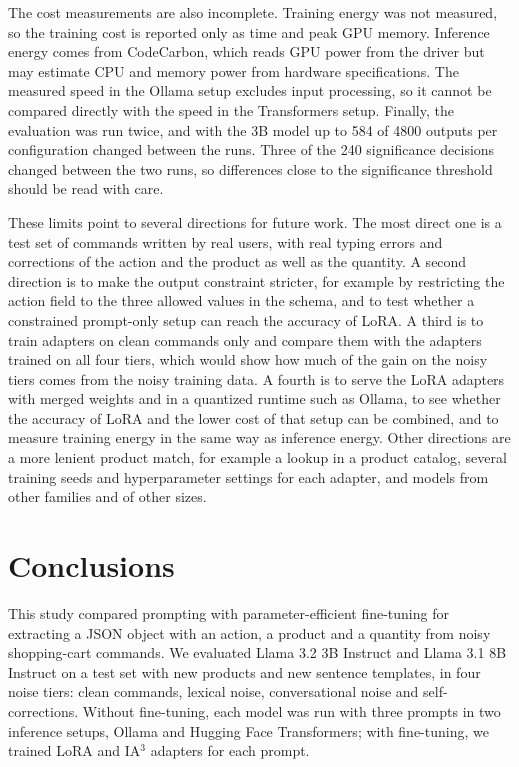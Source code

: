 \documentclass[journal,article,submit,pdftex,moreauthors]{Definitions/mdpi}
\begin{document}
The cost measurements are also incomplete. Training energy was not measured, so the training cost is reported only as time and peak GPU memory. Inference energy comes from CodeCarbon, which reads GPU power from the driver but may estimate CPU and memory power from hardware specifications. The measured speed in the Ollama setup excludes input processing, so it cannot be compared directly with the speed in the Transformers setup. Finally, the evaluation was run twice, and with the 3B model up to 584 of 4800 outputs per configuration changed between the runs. Three of the 240 significance decisions changed between the two runs, so differences close to the significance threshold should be read with care.

These limits point to several directions for future work. The most direct one is a test set of commands written by real users, with real typing errors and corrections of the action and the product as well as the quantity. A second direction is to make the output constraint stricter, for example by restricting the action field to the three allowed values in the schema, and to test whether a constrained prompt-only setup can reach the accuracy of LoRA. A third is to train adapters on clean commands only and compare them with the adapters trained on all four tiers, which would show how much of the gain on the noisy tiers comes from the noisy training data. A fourth is to serve the LoRA adapters with merged weights and in a quantized runtime such as Ollama, to see whether the accuracy of LoRA and the lower cost of that setup can be combined, and to measure training energy in the same way as inference energy. Other directions are a more lenient product match, for example a lookup in a product catalog, several training seeds and hyperparameter settings for each adapter, and models from other families and of other sizes.


\section{Conclusions}\label{sec:conclusions}


This study compared prompting with parameter-efficient fine-tuning for extracting a JSON object with an action, a product and a quantity from noisy shopping-cart commands. We evaluated Llama 3.2 3B Instruct and Llama 3.1 8B Instruct on a test set with new products and new sentence templates, in four noise tiers: clean commands, lexical noise, conversational noise and self-corrections. Without fine-tuning, each model was run with three prompts in two inference setups, Ollama and Hugging Face Transformers; with fine-tuning, we trained LoRA and IA$^3$ adapters for each prompt.
\end{document}
